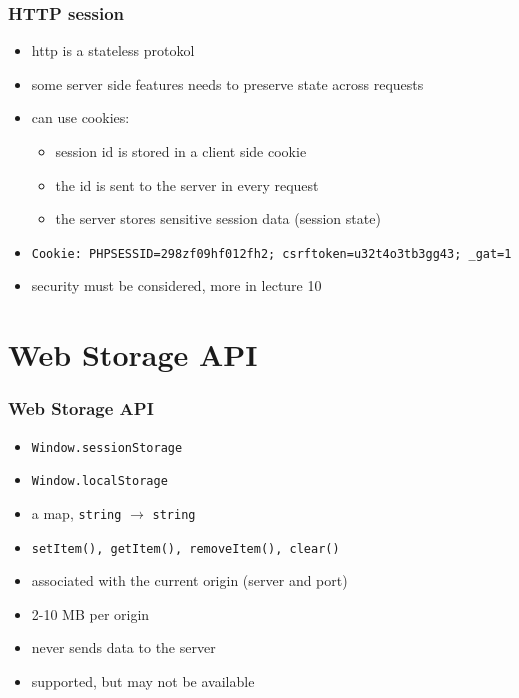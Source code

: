 \begin{frame}[fragile]\frametitle{HTTP session}
\color{structure}
\begin{itemize}\color{structure}
  \item http is a stateless protokol
  \item some server side features needs to preserve state across requests
  \item can use cookies:
  \begin{itemize}
    \item session id is stored in a client side cookie
    \item the id is sent to the server in every request
    \item the server stores sensitive session data (session state)
  \end{itemize}
  \item \texttt{Cookie: PHPSESSID=298zf09hf012fh2; csrftoken=u32t4o3tb3gg43; \_gat=1}
  \item security must be considered, more in lecture 10
\end{itemize}
\end{frame}

\section{Web Storage API}
\begin{frame}[fragile]\frametitle{Web Storage API}
\color{structure}

\begin{itemize}\color{structure}
  \item \texttt{Window.sessionStorage}
  \item \texttt{Window.localStorage}
  \item a map, \texttt{string} $\rightarrow$ \texttt{string}
  \item \texttt{setItem(), getItem(), removeItem(), clear()}
  \item associated with the current origin (server and port)
  \item 2-10 MB per origin
  \item never sends data to the server
  \item supported, but may not be available
\end{itemize}
\end{frame}

